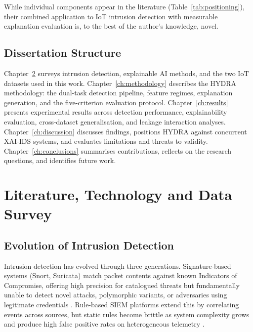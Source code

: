\documentclass[12pt,a4paper]{report}
\begin{document}
While individual components appear in the literature (Table~\ref{tab:positioning}), their combined application to IoT intrusion detection with measurable explanation evaluation is, to the best of the author's knowledge, novel.


\section{Dissertation Structure}
\label{sec:structure}

Chapter~\ref{ch:literature} surveys intrusion detection, explainable AI methods, and the two IoT datasets used in this work. Chapter~\ref{ch:methodology} describes the HYDRA methodology: the dual-task detection pipeline, feature regimes, explanation generation, and the five-criterion evaluation protocol. Chapter~\ref{ch:results} presents experimental results across detection performance, explainability evaluation, cross-dataset generalisation, and leakage interaction analyses. Chapter~\ref{ch:discussion} discusses findings, positions HYDRA against concurrent XAI-IDS systems, and evaluates limitations and threats to validity. Chapter~\ref{ch:conclusions} summarises contributions, reflects on the research questions, and identifies future work.

\chapter{Literature, Technology and Data Survey}
\label{ch:literature}

\section{Evolution of Intrusion Detection}
\label{sec:evolution}

Intrusion detection has evolved through three generations. Signature-based systems (Snort, Suricata) match packet contents against known Indicators of Compromise, offering high precision for catalogued threats but fundamentally unable to detect novel attacks, polymorphic variants, or adversaries using legitimate credentials \cite{ahmad2021}. Rule-based SIEM platforms extend this by correlating events across sources, but static rules become brittle as system complexity grows and produce high false positive rates on heterogeneous telemetry \cite{zhu2023}.
\end{document}

